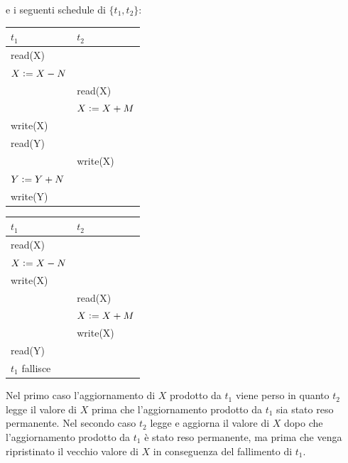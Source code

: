  e i seguenti schedule di $\{t_1,t_2\}$:

 \begin{multicols}{2}  
 \begin{tabular}{|l|l|}
 \hline
 $t_1$ & $t_2$\\
 \hline
   read(X) & \\ 
   $X\vcentcolon=X-N$ & \\ 
   & read(X)\\
   & $X\vcentcolon=X+M$\\ 
   write(X) &\\ 
   read(Y) &\\
   & write(X)\\
   $Y\vcentcolon=Y+N$ &\\
   write(Y)&\\
   \hline
  \end{tabular}
  
  \begin{tabular}{|l|l|}
   \hline
   $t_1$ & $t_2$\\
   \hline
   read(X) & \\ 
   $X\vcentcolon=X-N$ & \\ 
   write(X) &\\ 
   & read(X)\\
   & $X\vcentcolon=X+M$\\ 
   & write(X)\\
   read(Y) &\\
   $t_1$ fallisce &\\
 
   \hline
  \end{tabular}
  
  
 \end{multicols}

Nel primo caso l'aggiornamento di $X$ prodotto da $t_1$ viene perso in quanto $t_2$ legge il valore di $X$
prima che l'aggiornamento prodotto da $t_1$ sia stato reso permanente. Nel secondo caso $t_2$ legge e
aggiorna il valore di $X$ dopo che l'aggiornamento prodotto da $t_1$ è stato reso permanente, ma prima
che venga ripristinato il vecchio valore di $X$ in conseguenza del fallimento di $t_1$.\\

